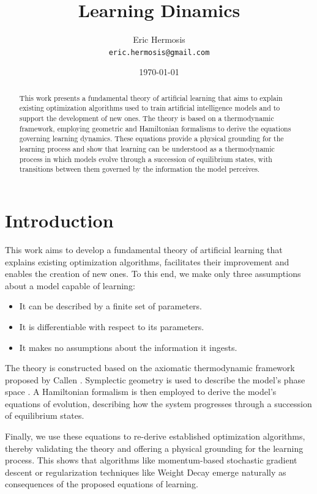 \documentclass[12pt]{article}
\title{Learning Dinamics}
\author{Eric Hermosis \\ \texttt{eric.hermosis@gmail.com}}
\date{\today}
\begin{document}
\maketitle

\begin{abstract}
This work presents a fundamental theory of artificial learning that aims to explain existing optimization algorithms used to train artificial intelligence models and to support the development of new ones. The theory is based on a thermodynamic framework, employing geometric and Hamiltonian formalisms to derive the equations governing learning dynamics. These equations provide a physical grounding for the learning process and show that learning can be understood as a thermodynamic process in which models evolve through a succession of equilibrium states, with transitions between them governed by the information the model perceives.
\end{abstract}

\section*{Introduction}

This work aims to develop a fundamental theory of artificial learning that explains existing optimization algorithms, facilitates their improvement and enables the creation of new ones. To this end, we make only three assumptions about a model capable of learning:

\begin{itemize}
  \item It can be described by a finite set of parameters.
  \item It is differentiable with respect to its parameters.
  \item It makes no assumptions about the information it ingests.
\end{itemize}
The theory is constructed based on the axiomatic thermodynamic framework proposed by Callen \cite{callen_thermo}. Symplectic geometry is used to describe the model’s phase space \cite{cannas_symph}. A Hamiltonian formalism \cite{arnold_mechanics} is then employed to derive the model’s equations of evolution, describing how the system progresses through a succession of equilibrium states.

Finally, we use these equations to re-derive established optimization algorithms, thereby validating the theory and offering a physical grounding for the learning process. This shows that algorithms like momentum-based stochastic gradient descent \cite{bishop_dl} or regularization techniques like Weight Decay \cite{krogh_weight_decay} emerge naturally as consequences of the proposed equations of learning.
\end{document}
